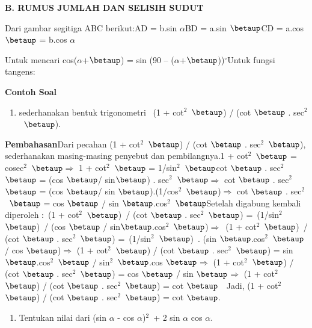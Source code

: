 \documentclass[11pt,fleqn]{book} %
\begin{document}
\noindent \textbf{B. RUMUS JUMLAH DAN SELISIH SUDUT}

\noindent Dari gambar segitiga ABC berikut:AD = b.sin $\alpha$BD = a.sin $\betaup$CD = a.cos $\betaup$ = b.cos $\alpha$

\noindent Untuk mencari cos($\alpha$+$\betaup$) = sin (90 -- ($\alpha$+$\betaup$))${}^\circ$Untuk fungsi tangens:\textbf{}

\noindent \textbf{Contoh Soal}

\begin{enumerate}
\item \textbf{ }sederhanakan bentuk trigonometri~ (1 + cot${}^{2}$~$\betaup$) / (cot $\betaup$ . sec${}^{2}$~$\betaup$).
\end{enumerate}

\noindent \textbf{Pembahasan}Dari pecahan (1 + cot${}^{2}$~$\betaup$) / (cot $\betaup$ . sec${}^{2}$~$\betaup$), sederhanakan masing-masing penyebut dan pembilangnya.1 + cot${}^{2}$~$\betaup$ = cosec${}^{2}$~$\betaup$$\mathrm{\Rightarrow }$ 1 + cot${}^{2}$~$\betaup$ = 1/sin${}^{2}$~$\betaup$cot $\betaup$ . sec${}^{2}$~$\betaup$ = (cos $\betaup$/ sin$\betaup$) . sec${}^{2}$~$\betaup$$\mathrm{\Rightarrow }$ cot $\betaup$ . sec${}^{2}$~$\betaup$ = (cos $\betaup$/ sin $\betaup$).(1/cos${}^{2}$~$\betaup$)$\mathrm{\Rightarrow }$ cot $\betaup$ . sec${}^{2}$~$\betaup$ = cos $\betaup$ / sin $\betaup$.cos${}^{2}$~$\betaup$Setelah digabung kembali diperoleh :~(1 + cot${}^{2}$~$\betaup$)~/ (cot $\betaup$ . sec${}^{2}$~$\betaup$) =~(1/sin${}^{2}$~$\betaup$)~/ (cos $\betaup$ / sin$\betaup$.cos${}^{2}$~$\betaup$)$\mathrm{\Rightarrow }$~(1 + cot${}^{2}$~$\betaup$)~/ (cot $\betaup$ . sec${}^{2}$~$\betaup$) =~(1/sin${}^{2}$~$\betaup$)~. (sin $\betaup$.cos${}^{2}$~$\betaup$ / cos $\betaup$)$\mathrm{\Rightarrow }$ (1 + cot${}^{2}$~$\betaup$) / (cot $\betaup$ . sec${}^{2}$~$\betaup$) = sin $\betaup$.cos${}^{2}$~$\betaup$ / sin${}^{2}$~$\betaup$.cos $\betaup$$\mathrm{\Rightarrow }$ (1 + cot${}^{2}$~$\betaup$) / (cot $\betaup$ . sec${}^{2}$~$\betaup$) = cos $\betaup$ / sin $\betaup$$\mathrm{\Rightarrow }$ (1 + cot${}^{2}$~$\betaup$) / (cot $\betaup$ . sec${}^{2}$~$\betaup$) = cot $\betaup$~~Jadi, (1 + cot${}^{2}$~$\betaup$) / (cot $\betaup$ . sec${}^{2}$~$\betaup$) = cot $\betaup$.

\begin{enumerate}
\item  Tentukan nilai dari (sin $\alpha$ - cos $\alpha$)${}^{2}$~+ 2 sin $\alpha$ cos $\alpha$.
\end{enumerate}
\end{document}
